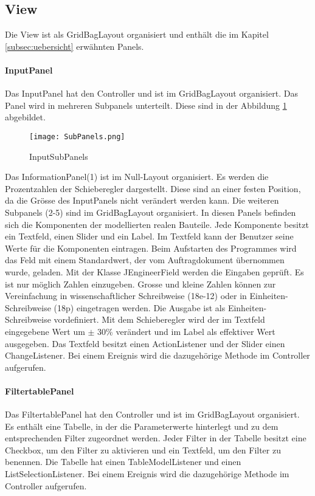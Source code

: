 \subsection{View} \label{subsec:view}
Die View ist als GridBagLayout organisiert und enthält die im Kapitel \ref{subsec:uebersicht} erwähnten Panels.
\bigskip

\paragraph{InputPanel} \label{par:inputpanel}

Das InputPanel hat den Controller und ist im GridBagLayout organisiert. Das Panel wird in mehreren Subpanels unterteilt. Diese sind in der Abbildung  \ref{fig:subpanels} abgebildet. 

\begin{figure}[H]
	\centering
	\texttt{[image: SubPanels.png]}
	\caption{InputSubPanels}
	\label{fig:subpanels}
\end{figure} 

Das InformationPanel(1) ist im Null-Layout organisiert. Es werden die Prozentzahlen der Schieberegler dargestellt. Diese sind an einer festen Position, da die Grösse des InputPanels nicht verändert werden kann. Die weiteren Subpanels (2-5) sind im GridBagLayout organisiert. In diesen Panels befinden sich die Komponenten der modellierten realen Bauteile. Jede Komponente besitzt ein Textfeld, einen Slider und ein Label. Im Textfeld kann der Benutzer seine Werte für die Komponenten eintragen. Beim Aufstarten des Programmes wird das Feld mit einem Standardwert, der vom Auftragdokument übernommen wurde, geladen. Mit der Klasse JEngineerField werden die Eingaben geprüft. Es ist nur möglich Zahlen einzugeben. Grosse und kleine Zahlen können zur Vereinfachung in wissenschaftlicher Schreibweise (18e-12) oder in Einheiten-Schreibweise (18p) eingetragen werden. Die Ausgabe ist als Einheiten-Schreibweise vordefiniert. Mit dem Schieberegler wird der im Textfeld eingegebene Wert um $\pm$ 30\% verändert und im Label als effektiver Wert ausgegeben. Das Textfeld besitzt einen ActionListener und der Slider einen ChangeListener. Bei einem Ereignis wird die dazugehörige Methode im Controller  aufgerufen.
\bigskip

\paragraph{FiltertablePanel} \label{par:filterpanel}

Das FiltertablePanel hat den Controller und ist im GridBagLayout organisiert. Es enthält eine Tabelle, in der die Parameterwerte hinterlegt und zu dem entsprechenden Filter zugeordnet werden. Jeder Filter in der Tabelle besitzt eine Checkbox, um den Filter zu aktivieren und ein Textfeld, um den Filter  zu benennen. Die Tabelle hat einen TableModelListener und einen ListSelectionListener. Bei einem Ereignis wird die dazugehörige Methode im Controller  aufgerufen.
\bigskip


